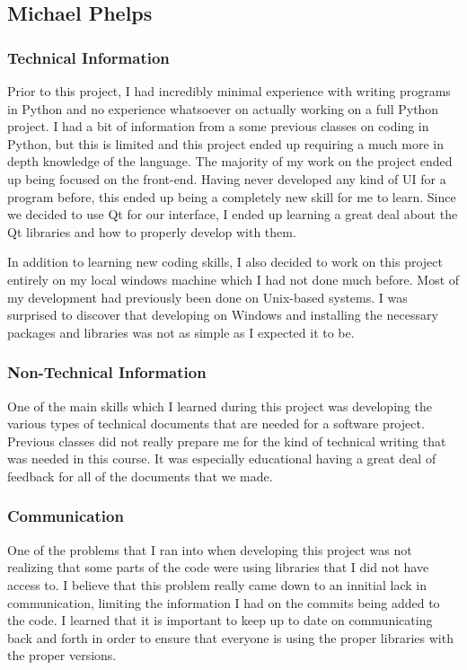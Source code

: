 \documentclass[letterpaper,10pt, onecolumn, draftclsnofoot]{IEEEtran}
\begin{document}
\subsection{Michael Phelps}
\subsubsection{Technical Information}
Prior to this project, I had incredibly minimal experience with writing programs in Python and no experience whatsoever on actually working on a full Python project. I had a bit of information from a some previous classes on coding in Python, but this is limited and this project ended up requiring a much more in depth knowledge of the language. The majority of my work on the project ended up being focused on the front-end. Having never developed any kind of UI for a program before, this ended up being a completely new skill for me to learn. Since we decided to use Qt for our interface, I ended up learning a great deal about the Qt libraries and how to properly develop with them. 

In addition to learning new coding skills, I also decided to work on this project entirely on my local windows machine which I had not done much before. Most of my development had previously been done on Unix-based systems. I was surprised to discover that developing on Windows and installing the necessary packages and libraries was not as simple as I expected it to be.

\subsubsection{Non-Technical Information}
One of the main skills which I learned during this project was developing the various types of technical documents that are needed for a software project. Previous classes did not really prepare me for the kind of technical writing that was needed in this course. It was especially educational having a great deal of feedback for all of the documents that we made.

\subsubsection{Communication}
One of the problems that I ran into when developing this project was not realizing that some parts of the code were using libraries that I did not have access to. I believe that this problem really came down to an innitial lack in communication, limiting the information I had on the commits being added to the code. I learned that it is important to keep up to date on communicating back and forth in order to ensure that everyone is using the proper libraries with the proper versions. 
\end{document}
